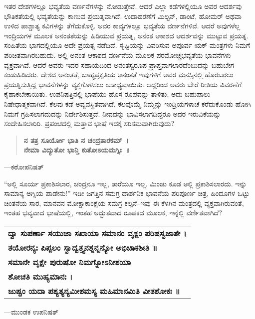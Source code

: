 ಇತರ ದೇಶಗಳಲ್ಲೂ ಭವ್ಯತೆಯ ವರ್ಣನೆಗಳನ್ನು ನೋಡುತ್ತೇವೆ. ಆದರೆ ಎಲ್ಲಾ ಕಡೆಗಳಲ್ಲಿಯೂ ಅವರ ಆದರ್ಶವು ಭೌತಿಕತೆಯಲ್ಲಿ ಭವ್ಯತೆಯನ್ನು ಕಾಣುವ ಪ್ರಯತ್ನವಾಗಿದೆ. ಉದಾಹರಣೆಗೆ ಮಿಲ್ಟನ್​, ಡಾಂಟೆ, ಹೋಮರ್​ ಅಥವಾ ಉಳಿದ ಪಾಶ್ಚಾತ್ಯ ಕವಿಗಳನ್ನು ತೆಗೆದುಕೊಳ್ಳಿ. ಅವರ ಕಾವ್ಯಗಳಲ್ಲೂ ಭವ್ಯತೆಯ ವರ್ಣನೆಗಳಿವೆ. ಆದರೆ ಅವುಗಳೆಲ್ಲ ಇಂದ್ರಿಯಗಳ ಮೂಲಕ ಅನಂತತೆಯನ್ನು ಹಿಡಿಯುವ ಪ್ರಯತ್ನ, ಅನಂತ ಆಕಾಶದ ಆದರ್ಶವನ್ನು ಮುಟ್ಟುವ ಪ್ರಯತ್ನ. ಸಂಹಿತೆಯ ಭಾಗದಲ್ಲಿಯೂ ಅದೇ ಪ್ರಯತ್ನ ನಡೆದಿದೆ. ಸೃಷ್ಟಿಯನ್ನು ವಿವರಿಸುವ ಅಪೂರ್ವ ಋಕ್​ ಮಂತ್ರಗಳು ನಿಮಗೆ ಪರಿಚಿತವಾಗಿರಬಹುದು. ಅಲ್ಲಿ ಅನಂತ ಆಕಾಶದ ವರ್ಣನೆಯ ಮೂಲಕ ಪರಮೋಚ್ಚ\break ಭವ್ಯತೆಯ ಭಾವನೆಗಳು ವ್ಯಕ್ತವಾಗಿವೆ. ಆದರೆ ಅವರು ಇದರ ಸಹಾಯದಿಂದ ಅನಂತಸ್ವರೂಪ ಪ್ರಾಪ್ತವಾಗಲಾರದೆಂಬುದನ್ನು ಬಹುಬೇಗ ಕಂಡುಹಿಡಿದರು. ದೇಶದ ಅನಂತತೆ, ಬಾಹ್ಯಪ್ರಕೃತಿಯ ಅನಂತತೆ ಇವುಗಳಿಗೆ ಅವರ ಮನಸ್ಸಿ\-ನಲ್ಲಿ ಹೊರಬರಲು ಪ್ರಯತ್ನಿಸುತ್ತಿದ್ದ ಭಾವನೆಗಳನ್ನು ವ್ಯಕ್ತಗೊಳಿಸಲು ಅಸಾಧ್ಯವಾಯಿತು. ಆದ್ದರಿಂದ ಅವರು ಬೇರೆ ರೀತಿಯ ವಿವರಣೆಗೆ ಕೈಹಾಕಬೇಕಾಯಿತು. ಉಪನಿಷತ್ತಿನಲ್ಲಿ ಭಾಷೆಯು ಹೊಸ ರೂಪವನ್ನು ತಾಳಿತು. ಅದು ಬಹುಪಾಲು ನಿಷೇಧಾತ್ಮಕವಾಗಿದೆ. ಕೆಲವು ಕಡೆ ಅವ್ಯವಸ್ಥಿತವಾಗಿದೆ. ಕೆಲವೊಮ್ಮೆ ನಿಮ್ಮನ್ನು ಇಂದ್ರಿಯಗಳಾಚೆ ಕರೆದುಕೊಂಡು ಹೋಗಿ ನಿಮಗೆ ಗ್ರಹಿಸಲಾಗದುದನ್ನು ನಿರ್ದೇಶಿಸುತ್ತದೆ. ನೀವದನ್ನು ಭಾವಿಸಲಾಗದಿದ್ದರೂ ಅದರ ಇರುವಿಕೆಯನ್ನು ಸಂದೇಹಿಸಲಾರಿರಿ. ಪ್ರಪಂಚದಲ್ಲಿ ಮತ್ತಾವ ಭಾಷೆ ಇದಕ್ಕೆ ಸರಿಸಮವಾಗಿರುವುದು?

\begin{verse}
\textbf{ನ ತತ್ರ ಸೂರ್ಯೋ ಭಾತಿ ನ ಚಂದ್ರತಾರಕಮ್​~।}\\\textbf{ನೇಮಾ ವಿದ್ಯುತೋ ಭಾನ್ತಿ ಕುತೋಽಯಮಗ್ನಿಃ~॥}
\end{verse}

\hfill —ಕಠೋಪನಿಷತ್​

\vskip 5pt

“ಅಲ್ಲಿ ಸೂರ್ಯ ಪ್ರಕಾಶಿಸಲಾರ, ಚಂದ್ರನೂ ಇಲ್ಲ, ತಾರೆಯೂ ಇಲ್ಲ. ಮಿಂಚು ಕೂಡ ಅಲ್ಲಿ ಪ್ರಕಾಶಿಸಲಾರದು. ಇನ್ನು ಸಾಮಾನ್ಯ ಅಗ್ನಿಯ ಪಾಡೇನು!” ಇಡೀ ಜಗತ್ತಿನ ಸಮಗ್ರ ದಾರ್ಶನಿಕ ಭಾವನೆಯ ಪರಿಪೂರ್ಣ ಚಿತ್ರ, ಹಿಂದೂಗಳ ಒಟ್ಟು ಚಿಂತನೆಯ ಸಾರ, ಮಾನವನ ಮೋಕ್ಷಾಕಾಂಕ್ಷೆಯ ಸಮಗ್ರ ಕಲ್ಪನೆ–ಇವು ಈ ಕೆಳಗಿನ ಮಂತ್ರದಲ್ಲಿ ವ್ಯಕ್ತವಾಗಿರುವಂತೆ, ಇಂತಹ ಭವ್ಯವಾದ ಭಾಷೆಯಲ್ಲಿ, ಇಂತಹ ಅದ್ಭುತವಾದ ರೂಪಕದ ಮೂಲಕ, ಇನ್ನೆಲ್ಲಿ ವರ್ಣಿತವಾಗಿದೆ?

\begin{longtable}{@{\hspace{-18pt}}l@{}}
\textbf{ದ್ವಾ ಸುಪರ್ಣಾ ಸಯುಜಾ ಸಖಾಯಾ ಸಮಾನಂ ವೃಕ್ಷಂ ಪರಿಷಸ್ವಜಾತೇ ।} \\
\textbf{ತಯೋರನ್ಯಃ ಪಿಪ್ಪಲಂ ಸ್ವಾದ್ವತ್ತ್ಯನಶ್ನನ್ನನ್ಯೋ ಅಭಿಚಾಕಶೀತಿ ॥} \\
\textbf{ಸಮಾನೇ ವೃಕ್ಷೇ ಪುರುಷೋ ನಿಮಗ್ನೋಽನೀಶಯಾ} \\
\textbf{ಶೋಚತಿ ಮುಹ್ಯಮಾನಃ ।} \\
\textbf{ಜುಷ್ಟಂ ಯದಾ ಪಶ್ಯತ್ಯನ್ಯಮೀಶಮಸ್ಯ ಮಹಿಮಾನಮಿತಿ ವೀತಶೋಕಃ ॥} \\
\end{longtable}

\hfill —ಮುಂಡಕ ಉಪನಿಷತ್​

